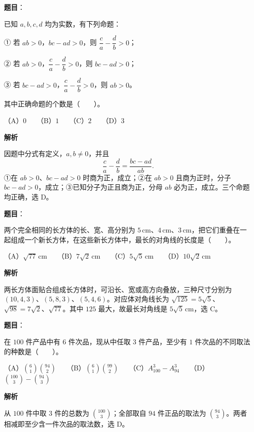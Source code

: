 \begin{answer}

\textbf{题目}：

已知 $a,b,c,d$ 均为实数，有下列命题：

① 若 $ab>0$，$bc-ad>0$，则 $\dfrac{c}{a}-\dfrac{d}{b}>0$；

② 若 $ab>0$，$\dfrac{c}{a}-\dfrac{d}{b}>0$，则 $bc-ad>0$；

③ 若 $bc-ad>0$，$\dfrac{c}{a}-\dfrac{d}{b}>0$，则 $ab>0$。

其中正确命题的个数是\mbox{（　　）}。

（A）$0$　　（B）$1$　　（C）$2$　　（D）$3$

\textbf{解析}

因题中分式有定义，$a,b\ne0$，并且
\nopagebreak[4]
\[
\frac ca-\frac db=\frac{bc-ad}{ab}.
\]
①在 $ab>0$、$bc-ad>0$ 时商为正，成立；②在 $ab>0$ 且商为正时，分子 $bc-ad>0$，成立；③已知分子为正且商为正，分母 $ab$ 必为正，成立。三个命题均正确，选 D。


\end{answer}
\begin{answer}

\textbf{题目}：

两个完全相同的长方体的长、宽、高分别为 $5\,\text{cm}$、$4\,\text{cm}$、$3\,\text{cm}$，把它们重叠在一起组成一个新长方体，在这些新长方体中，最长的对角线的长度是\mbox{（　　）}。

（A）$\sqrt{77}\,\text{cm}$　　（B）$7\sqrt2\,\text{cm}$　　（C）$5\sqrt5\,\text{cm}$　　（D）$10\sqrt2\,\text{cm}$

\textbf{解析}

两长方体面贴合组成长方体时，可沿长、宽或高方向叠放，三种尺寸分别为 $(10,4,3)$、$(5,8,3)$、$(5,4,6)$。对应体对角线长为 $\sqrt{125}=5\sqrt5$、$\sqrt{98}=7\sqrt2$、$\sqrt{77}$。其中 $125$ 最大，故最长对角线是 $5\sqrt5\,\text{cm}$，选 C。


\end{answer}
\begin{answer}

\textbf{题目}：

在 $100$ 件产品中有 $6$ 件次品，现从中任取 $3$ 件产品，至少有 $1$ 件次品的不同取法的种数是\mbox{（　　）}。

（A）$\binom61\binom{94}2$　　（B）$\binom61\binom{99}2$　　（C）$A_{100}^3-A_{94}^3$　　（D）$\binom{100}3-\binom{94}3$

\textbf{解析}

从 $100$ 件中取 $3$ 件的总数为 $\binom{100}{3}$；全部取自 $94$ 件正品的取法为 $\binom{94}{3}$。两者相减即至少含一件次品的取法数，选 D。


\end{answer}

